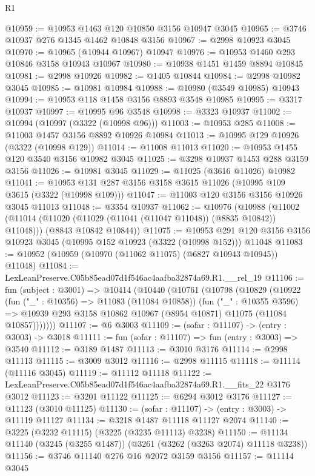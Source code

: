 \begin{lexlean}{R1}
\begin{coremodule}
@10959 := @10953 @1463 @120 @10850 @3156 @10947 @3045
@10965 := @3746 @10937 @276 @1345 @1462 @10848 @3156
@10967 := @2998 @10923 @3045
@10970 := @10965 (@10944 @10967) @10947
@10976 := @10953 @1460 @293 @10846 @3158 @10943 @10967
@10980 := @10938 @1451 @1459 @8894 @10845
@10981 := @2998 @10926
@10982 := @1405 @10844
@10984 := @2998 @10982 @3045
@10985 := @10981 @10984
@10988 := @10980 (@3549 @10985) @10943
@10994 := @10953 @118 @1458 @3156 @8893 @3548 @10985
@10995 := @3317 @10937
@10997 := @10995 @96 @3548
@10998 := @3323 @10937
@11002 := @10994 (@10997 (@3322 (@10998 @96)))
@11003 := @10953 @285
@11008 := @11003 @1457 @3156 @8892 @10926 @10984
@11013 := @10995 @129 @10926 (@3322 (@10998 @129))
@11014 := @11008 @11013
@11020 := @10953 @1455 @120 @3540 @3156 @10982 @3045
@11025 := @3298 @10937 @1453 @288 @3159 @3156
@11026 := @10981 @3045
@11029 := @11025 (@3616 @11026) @10982
@11041 := @10953 @131 @287 @3156 @3158 @3615 @11026 (@10995 @109 @3615 (@3322 (@10998 @109)))
@11047 := @11003 @120 @3156 @3156 @10926 @3045 @11013
@11048 := @3354 @10937
@11062 := @10976
    (@10988
      (@11002 (@11014 (@11020 (@11029 (@11041 (@11047 @11048)) (@8835 @10842)) @11048)))
      (@8843 @10842 @10844))
@11075 := @10953
    @291
    @120
    @3156
    @3156
    @10923
    @3045
    (@10995 @152 @10923 (@3322 (@10998 @152)))
    @11048
@11083 := @10952 (@10959 (@10970 (@11062 @11075) (@6827 @10943 @10945)) @11048)
@11084 := LexLeanPreserve.C05b85ead07d1f546ac4aafba32874a69.R1.__rel_19
@11106 := fun (subject : @3001) =>
  @10414
    (@10440
      (@10761
        (@10798
          (@10829
            (@10922
              (fun ("_" : @10356) => @11083 (@11084 @10858))
              (fun ("_" : @10355 @3596) =>
              @10939 @293 @3158 @10862 @10967 (@8954 @10871) @11075 (@11084 @10857)))))))
@11107 := @6 @3003
@11109 := (sofar : @11107) -> (entry : @3003) -> @3018
@11111 := fun (sofar : @11107) => fun (entry : @3003) => @3540
@11112 := @3189 @1487
@11113 := @3010 @3176
@11114 := @2998 @11113
@11115 := @3009 @3012
@11116 := @2998 @11115
@11118 := @11114 (@11116 @3045)
@11119 := @11112 @11118
@11122 := LexLeanPreserve.C05b85ead07d1f546ac4aafba32874a69.R1.__fits_22 @3176 @3012
@11123 := @3201 @11122
@11125 := @6294 @3012 @3176
@11127 := @11123 (@3010 @11125)
@11130 := (sofar : @11107) -> (entry : @3003) -> @11119 @11127
@11134 := @3218 @1487 @11118 @11127 @2074
@11140 := @3225 (@3232 @11115) (@3225 (@3235 @11113) @3238)
@11150 := @11134 @11140 (@3245 (@3255 @1487)) (@3261 (@3262 (@3263 @2074) @11118 @3238))
@11156 := @3746 @11140 @276 @16 @2072 @3159 @3156
@11157 := @11114 @3045

\end{coremodule}
\end{lexlean}
